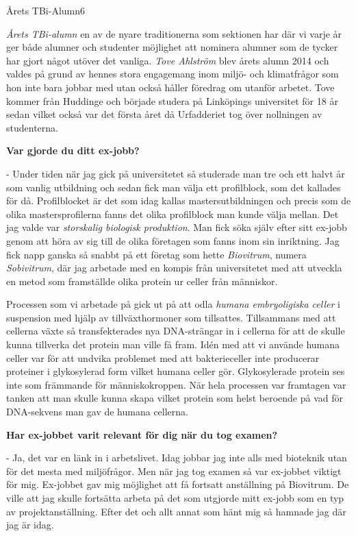 \begin{news}{2}{Årets TBi-Alumn}{}{}{6}{}


\emph{Årets TBi-alumn} en av de nyare traditionerna som sektionen har där vi varje 
år ger både alumner och studenter möjlighet att nominera alumner som de 
tycker har gjort något utöver det vanliga. \emph{Tove Ahlström} blev årets alumn 
2014 och valdes på grund av hennes stora engagemang inom miljö- och 
klimatfrågor som hon inte bara jobbar med utan också håller föredrag om 
utanför arbetet. Tove kommer från Huddinge och började studera på Linköpings 
universitet för 18 år sedan vilket också var det första året då Urfadderiet 
tog över nollningen av studenterna.
 
\textbf{Var gjorde du ditt ex-jobb?}
 
 - Under tiden när jag gick på universitetet så studerade man tre och ett halvt 
 år som vanlig utbildning och sedan fick man välja ett profilblock, som det 
kallades för då. Profilblocket är det som idag kallas mastersutbildningen och 
precis som de olika mastersprofilerna fanns det olika profilblock man kunde 
välja mellan. Det jag valde var \emph{storskalig biologisk produktion}. Man fick 
söka själv efter sitt ex-jobb genom att höra av sig till de olika företagen 
som fanns inom sin inriktning. Jag fick napp ganska så snabbt på ett företag 
som hette \emph{Biovitrum}, numera \emph{Sobivitrum}, där jag arbetade med en kompis från 
universitetet med att utveckla en metod som framställde olika protein ur 
celler från människor.

Processen som vi arbetade på gick ut på att odla \emph{humana embryoligiska celler} 
i suspension med hjälp av tillväxthormoner som tillsattes. Tillsammans med 
att cellerna växte så transfekterades nya DNA-strängar in i cellerna för att 
de skulle kunna tillverka det protein man ville få fram. Idén med att 
vi använde humana celler var för att undvika problemet med att bakterieceller 
inte producerar proteiner i glykosylerad form vilket humana celler gör. 
Glykosylerade protein ses inte som främmande för människokroppen. När hela 
processen var framtagen var tanken att man skulle kunna skapa vilket protein 
som helst beroende på vad för DNA-sekvens man gav de humana cellerna.
 
\textbf{Har ex-jobbet varit relevant för dig när du tog examen?}

 - Ja, det var en länk in i arbetslivet. Idag jobbar jag inte alls med bioteknik 
utan för det mesta med miljöfrågor. Men när jag tog examen så var ex-jobbet 
viktigt för mig. Ex-jobbet gav mig möjlighet att få fortsatt anställning på 
Biovitrum. De ville att jag skulle fortsätta arbeta på det som utgjorde mitt 
ex-jobb som en typ av projektanställning. Efter det och allt annat som hänt 
mig så hamnade jag där jag är idag. 



\end{news}
